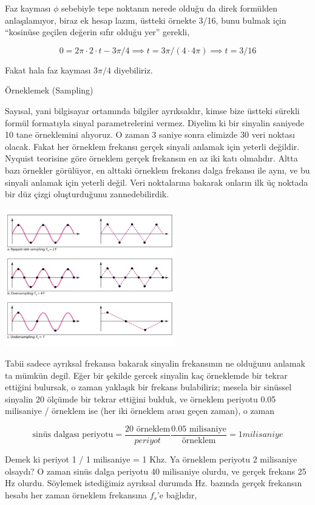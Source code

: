 \documentclass[12pt,fleqn]{article}\usepackage{../../common}
\begin{document}
Faz kayması $\phi$ sebebiyle tepe noktanın nerede olduğu da direk formülden
anlaşılamıyor, biraz ek hesap lazım, üstteki örnekte 3/16, bunu bulmak
için ``kosinüse geçilen değerin sıfır olduğu yer'' gerekli,

$$ 0 = 2\pi \cdot 2 \cdot t  - 3\pi/4 
\implies t = 3\pi / (4 \cdot 4\pi)  
\implies t = 3/16
$$

Fakat hala faz kayması $3\pi/4$ diyebiliriz. 

Örneklemek (Sampling)

Sayısal, yani bilgisayar ortamında bilgiler ayrıksaldır, kimse bize üstteki
sürekli formül formatıyla sinyal parametrelerini vermez. Diyelim ki bir
sinyalin saniyede 10 tane örneklemini alıyoruz. O zaman 3 saniye sonra
elimizde 30 veri noktası olacak. Fakat her örneklem frekansı gerçek sinyali
anlamak için yeterli değildir. Nyquist teorisine göre örneklem gerçek
frekansın en az iki katı olmalıdır. Altta bazı örnekler görülüyor, en
alttaki örneklem frekansı dalga frekansı ile aynı, ve bu sinyali anlamak
için yeterli değil. Veri noktalarına bakarak onların ilk üç noktada bir
düz çizgi oluşturduğunu zannedebilirdik.

\includegraphics[width=20em]{compscieng_1_30_10.png}

Tabii sadece ayrıksal frekansa bakarak sinyalin frekansının ne olduğunu
anlamak ta mümkün degil. Eğer bir şekilde gercek sinyalin kaç örneklemde
bir tekrar ettiğini bulursak, o zaman yaklaşık bir frekans bulabiliriz;
mesela bir sinüssel sinyalin 20 ölçümde bir tekrar ettiğini bulduk, ve
örneklem periyotu 0.05 milisaniye / örneklem ise (her iki örneklem arası
geçen zaman), o zaman

$$ 
\textrm{sinüs dalgası periyotu} =  
\frac{20 \textrm{ örneklem}}{periyot}
\frac{0.05 \textrm{ milisaniye}}{\textrm{örneklem}} = 1 milisaniye
$$

Demek ki periyot 1 / 1 milisaniye = 1 Khz. Ya örneklem periyotu 2
milisaniye olsaydı? O zaman sinüs dalga periyotu 40 milisaniye olurdu, ve
gerçek frekans 25 Hz olurdu. Söylemek istediğimiz ayrıksal durumda
Hz. bazında gerçek frekansın hesabı her zaman örneklem frekansına $f_s$'e
bağlıdır,
\end{document}
